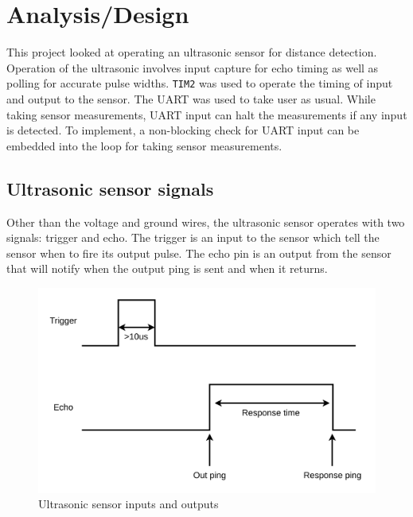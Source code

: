 \documentclass[CMPE]{KGCOEReport}
\def\code#1{\texttt{#1}}
\begin{document}
    \maketitle
    \section*{Analysis/Design}

    This project looked at operating an ultrasonic sensor for distance detection.
    Operation of the ultrasonic involves input capture for echo timing as well as
    polling for accurate pulse widths. \code{TIM2} was used to operate the timing
    of input and output to the sensor. The UART was used to take user as usual.
    While taking sensor measurements, UART input can halt the measurements if
    any input is detected. To implement, a non-blocking check for UART input can
    be embedded into the loop for taking sensor measurements.

	\subsection*{Ultrasonic sensor signals}

	Other than the voltage and ground wires, the ultrasonic sensor operates with two
	signals: trigger and echo. The trigger is an input to the sensor which tell the
	sensor when to fire its output pulse. The echo pin is an output from the sensor
	that will notify when the output ping is sent and when it returns.

	\begin{figure}[h!]
      \centering
      \includegraphics[width=5.5in]{Ultrasonic}
      \caption{Ultrasonic sensor inputs and outputs}
      \label{fig:us}
    \end{figure}
\end{document}
